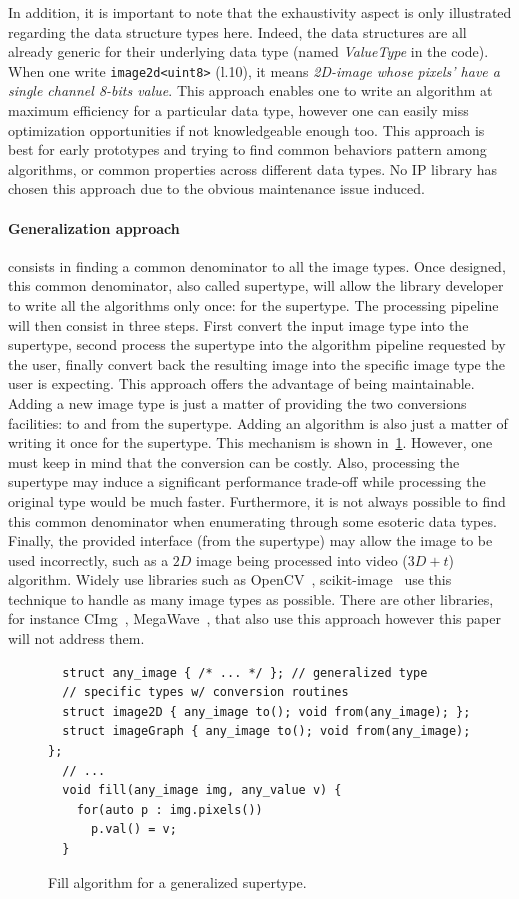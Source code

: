 In addition, it is important to note that the exhaustivity aspect is only illustrated regarding the data structure types
here. Indeed, the data structures are all already generic for their underlying data type (named \emph{ValueType} in the
code). When one write \texttt{image2d<uint8>} (l.10), it means \emph{2D-image whose pixels' have a single channel 8-bits
  value}. This approach enables one to write an algorithm at maximum efficiency for a particular data type, however one
can easily miss optimization opportunities if not knowledgeable enough too. This approach is best for early prototypes
and trying to find common behaviors pattern among algorithms, or common properties across different data types. No IP
library has chosen this approach due to the obvious maintenance issue induced.

\paragraph{Generalization approach} consists in finding a common denominator to all the image types. Once designed, this
common denominator, also called supertype, will allow the library developer to write all the algorithms only once: for
the supertype. The processing pipeline will then consist in three steps. First convert the input image type into the
supertype, second process the supertype into the algorithm pipeline requested by the user, finally convert back the
resulting image into the specific image type the user is expecting. This approach offers the advantage of being
maintainable. Adding a new image type is just a matter of providing the two conversions facilities: to and from the
supertype. Adding an algorithm is also just a matter of writing it once for the supertype. This mechanism is shown
in~\ref{fig.gen.generalized}. However, one must keep in mind that the conversion can be costly. Also, processing the
supertype may induce a significant performance trade-off while processing the original type would be much faster.
Furthermore, it is not always possible to find this common denominator when enumerating through some esoteric data
types. Finally, the provided interface (from the supertype) may allow the image to be used incorrectly, such as a $2D$
image being processed into video ($3D+t$) algorithm. Widely use libraries such as
OpenCV~\cite{bradski.2000.opencv}, scikit-image~\cite{vanderwalt.2014.skimage} use this technique to handle as many
image types as possible. There are other libraries, for instance CImg~\cite{tschumperle.2012.cimg},
MegaWave~\cite{froment.2012.megawave}, that also use this approach however this paper will not address them.
\begin{figure}[tbh]
  \centering
  \begin{verbatim}
  struct any_image { /* ... */ }; // generalized type
  // specific types w/ conversion routines
  struct image2D { any_image to(); void from(any_image); };
  struct imageGraph { any_image to(); void from(any_image); };
  // ...
  void fill(any_image img, any_value v) {
    for(auto p : img.pixels())
      p.val() = v;
  }
  \end{verbatim}
  \caption{Fill algorithm for a generalized supertype.}
  \label{fig.gen.generalized}
\end{figure}
